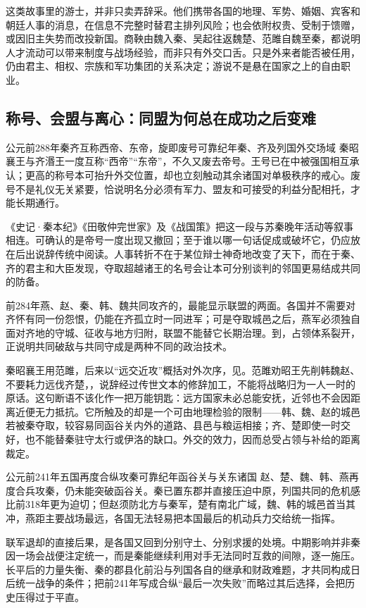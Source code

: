 这类故事里的游士，并非只卖弄辞采。他们携带各国的地理、军势、婚姻、宾客和朝廷人事的消息，在信息不完整时替君主排列风险；也会依附权贵、受制于馈赠，或因旧主失势而改投新国。商鞅由魏入秦、吴起往返魏楚、范雎自魏至秦，都说明人才流动可以带来制度与战场经验，而非只有外交口舌。只是外来者能否被任用，仍由君主、相权、宗族和军功集团的关系决定；游说不是悬在国家之上的自由职业。

\subsection{称号、会盟与离心：同盟为何总在成功之后变难}

\begin{event}{公元前288年}{秦齐互称西帝、东帝，旋即废号}{可靠纪年}{秦、齐及列国外交场域}
秦昭襄王与齐湣王一度互称“西帝”“东帝”，不久又废去帝号。王号已在中被强国相互承认；更高的称号本可抬升外交位置，却也立刻触动其余诸国对单极秩序的戒心。废号不是礼仪无关紧要，恰说明名分必须有军力、盟友和可接受的利益分配相托，才能长期通行。

《史记·秦本纪》《田敬仲完世家》及《战国策》把这一段与苏秦晚年活动等叙事相连。可确认的是帝号一度出现又撤回；至于谁以哪一句话促成或破坏它，仍应放在后出说辞传统中阅读。人事转折不在于某位辩士神奇地改变了天下，而在于秦、齐的君主和大臣发现，夺取超越诸王的名号会让本可分别谈判的邻国更易结成共同的防备。
\end{event}

前284年燕、赵、秦、韩、魏共同攻齐的，最能显示联盟的两面。各国并不需要对齐怀有同一份怨恨，仍能在齐孤立时一同进军；可是夺取城邑之后，燕军必须独自面对齐地的守城、征收与地方归附，联盟不能替它长期治理。到，占领体系裂开，正说明共同破敌与共同守成是两种不同的政治技术。

秦昭襄王用范雎，后来以“远交近攻”概括对外次序，见。范雎劝昭王先削韩魏赵、不要耗力远伐齐楚，，说辞经过传世文本的修辞加工，不能将战略归为一人一时的原话。这句断语不该化作一把万能钥匙：远方国家未必总能安抚，近邻也不会因距离近便无力抵抗。它所触及的却是一个可由地理检验的限制——韩、魏、赵的城邑若被秦夺取，较容易同函谷关内外的道路、县邑与粮运相接；齐、楚即使一时交好，也不能替秦驻守太行或伊洛的缺口。外交的效力，因而总受占领与补给的距离裁定。

\begin{event}{公元前241年}{五国再度合纵攻秦}{可靠纪年}{函谷关与关东诸国}
赵、楚、魏、韩、燕再度合兵攻秦，仍未能突破函谷关。秦已置东郡并直接压迫中原，列国共同的危机感比前318年更为迫切；但赵须防北方与秦军，楚有南北广域，魏、韩的城邑首当其冲，燕距主要战场最远，各国无法轻易把本国最后的机动兵力交给统一指挥。

联军退却的直接后果，是各国又回到分别守土、分别求援的处境。中期影响并非秦因一场会战便注定统一，而是秦能继续利用对手无法同时互救的间隙，逐一施压。长平后的力量失衡、秦的郡县化前沿与列国各自的继承和财政难题，才共同构成日后统一战争的条件；把前241年写成合纵“最后一次失败”而略过其后选择，会把历史压得过于平直。
\end{event}

